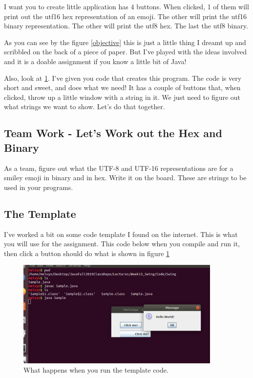 \documentclass[12pt]{article}
\begin{document}
I want you to create little application has 4 buttons. When clicked, 1 of them will print out the utf16 hex
representation of an emoji. The other will print the utf16 binary
representation. The other will print the utf8 hex. The last the utf8 binary. 

As you can see by the figure \ref{objective} this is just a little thing I
dreamt up and scribbled on the back of a piece of paper. But I've played with
the ideas involved and it is a doable assignment if you know a little bit of
Java!

Also, look at \ref{templateresult}. I've given you code that creates this
program. The code is very short and sweet, and does what we need! It has a
couple of buttons that, when clicked, throw up a little window with a string in
it. We just need to figure out what strings we want to show. Let's do that
together.

\subsection{Team Work - Let's Work out the Hex and Binary}

As a team, figure out what the UTF-8 and UTF-16 representations are for a smiley
emoji in binary and in hex. Write it on the board. These are strings to be used
in your programs.

\subsection{The Template}

I've worked a bit on some code template I found on the internet. This is what
you will use for the assignment. This code below when you compile and run it,
then click a button should do what is shown in figure \ref{templateresult}

\begin{figure}[h]
  \centering
    \includegraphics[width=0.9\textwidth]{Images/templateresult.png}
  \caption{What happens when you run the template code.}
  \label{templateresult}
\end{figure}
\end{document}
